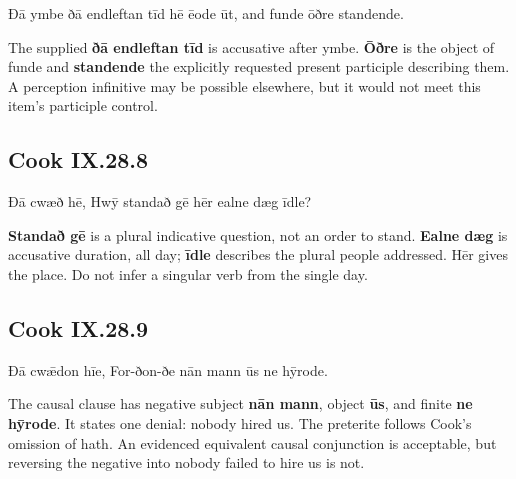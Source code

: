 \par\begin{minipage}{\linewidth}\raggedright
Ðā ymbe ðā endleftan tīd hē ēode ūt, and funde ōðre standende.

The supplied \textbf{ðā endleftan tīd} is accusative after ymbe. \textbf{Ōðre} is the object of funde and \textbf{standende} the explicitly requested present participle describing them. A perception infinitive may be possible elsewhere, but it would not meet this item’s participle control.

\end{minipage}\par\addvspace{4pt}

\subsection*{Cook IX.28.8}

\par\begin{minipage}{\linewidth}\raggedright
Ðā cwæð hē, Hwȳ standað gē hēr ealne dæg īdle?

\textbf{Standað gē} is a plural indicative question, not an order to stand. \textbf{Ealne dæg} is accusative duration, all day; \textbf{īdle} describes the plural people addressed. Hēr gives the place. Do not infer a singular verb from the single day.

\end{minipage}\par\addvspace{4pt}

\subsection*{Cook IX.28.9}

\par\begin{minipage}{\linewidth}\raggedright
Ðā cwǣdon hīe, For-ðon-ðe nān mann ūs ne hȳrode.

The causal clause has negative subject \textbf{nān mann}, object \textbf{ūs}, and finite \textbf{ne hȳrode}. It states one denial: nobody hired us. The preterite follows Cook’s omission of hath. An evidenced equivalent causal conjunction is acceptable, but reversing the negative into nobody failed to hire us is not.

\end{minipage}\par\addvspace{4pt}


